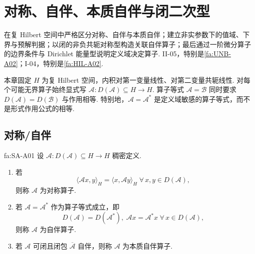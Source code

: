 \chapter{对称、自伴、本质自伴与闭二次型}\label{chap:II-06}
\FAChapterOpening
{在复 Hilbert 空间中严格区分对称、自伴与本质自伴；建立非实参数下的值域、下界与预解判据；以闭的非负共轭对称型构造关联自伴算子；最后通过一阶微分算子的边界条件与 Dirichlet 能量型说明定义域决定算子.}
{II-05，特别是\autoref{fa:UNB-A02}；I-04，特别是\autoref{fa:HIL-A02}.}
{\begin{center}
\end{center}}

本章固定 \(\displaystyle H\) 为复 Hilbert 空间，内积对第一变量线性、对第二变量共轭线性. 对每个可能无界算子始终显式写
\(\displaystyle \mathcal A:D(\mathcal A)\subseteq H\to H.\)
算子等式 \(\displaystyle\mathcal A=\mathcal B\) 同时要求 \(\displaystyle D(\mathcal A)=D(\mathcal B)\) 与作用相等. 特别地，\(\displaystyle\mathcal A=\mathcal A^*\) 是定义域敏感的算子等式，而不是形式作用公式的相等.

\newpage
\section{对称/自伴}\label{sec:ii06-symmetric-selfadjoint}

\begin{FADefinition}[A][对称、自伴与本质自伴]{fa:SA-A01}
设
\(\displaystyle \mathcal A:D(\mathcal A)\subseteq H\to H\)
稠密定义.
\begin{enumerate}[label=\textnormal{(\roman*)}]
\item 若
\[
\langle\mathcal Ax,y\rangle_H
=
\langle x,\mathcal Ay\rangle_H
\;
\forall\,x,y\in D(\mathcal A),
\]
则称 \(\displaystyle\mathcal A\) 为对称算子.
\item 若 \(\displaystyle\mathcal A=\mathcal A^*\) 作为算子等式成立，即
\[
D(\mathcal A)=D(\mathcal A^*),
\;
\mathcal Ax=\mathcal A^*x
\;
\forall\,x\in D(\mathcal A),
\]
则称 \(\displaystyle\mathcal A\) 为自伴算子.
\item 若 \(\displaystyle\mathcal A\) 可闭且闭包 \(\displaystyle\overline{\mathcal A}\) 自伴，则称 \(\displaystyle\mathcal A\) 为本质自伴算子.
\end{enumerate}
\end{FADefinition}

